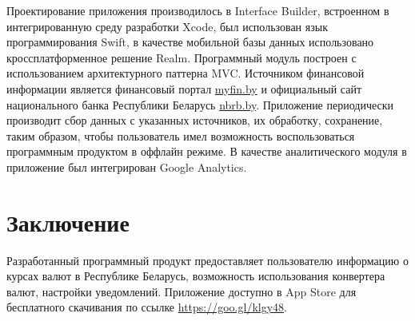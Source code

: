 \documentclass[a4paper,11pt,twoside]{article}
\begin{document}
\begin{multicols}{2}
Проектирование приложения производилось в Interface Builder, встроенном в
интегрированную среду разработки Xcode, был использован язык программирования Swift,
в качестве мобильной базы данных использовано кроссплатформенное решение Realm.
Программный модуль построен с использованием архитектурного паттерна MVC.
Источником финансовой информации является финансовый портал \url{myfin.by} и
официальный сайт национального банка Республики Беларусь \url{nbrb.by}.
Приложение периодически производит сбор данных с указанных источников,
их обработку, сохранение, таким образом, чтобы пользователь имел возможность
воспользоваться программным продуктом в оффлайн режиме.
В качестве аналитического модуля в приложение был интегрирован Google Analytics.

\section*{Заключение}
Разработанный программный продукт предоставляет пользователю информацию о курсах
валют в Республике Беларусь, возможность использования конвертера валют,
настройки уведомлений. Приложение доступно в App Store для бесплатного скачивания по
ссылке \url{https://goo.gl/klgy48}.


\end{multicols}


\end{document}
